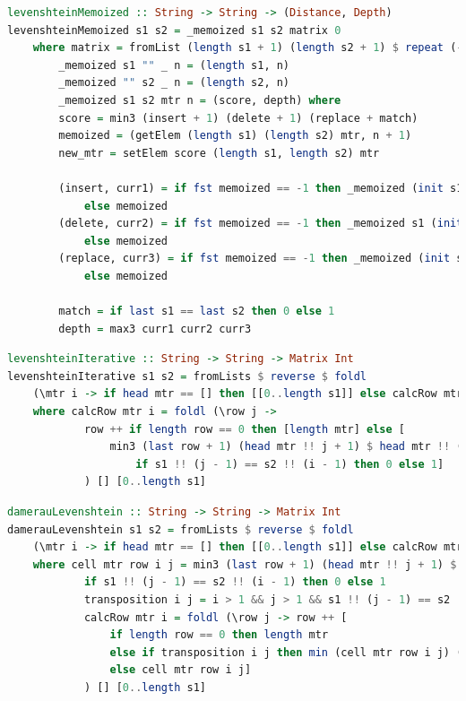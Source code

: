 \documentclass[12pt]{report}
\begin{document}
\begin{lstlisting}[label=some-code,caption=Функция нахождения расстояние Левенштейна рекурсивно с мемоизацией,language=Haskell]
levenshteinMemoized :: String -> String -> (Distance, Depth)
levenshteinMemoized s1 s2 = _memoized s1 s2 matrix 0
	where matrix = fromList (length s1 + 1) (length s2 + 1) $ repeat (-1) 
		_memoized s1 "" _ n = (length s1, n)
		_memoized "" s2 _ n = (length s2, n)
		_memoized s1 s2 mtr n = (score, depth) where
		score = min3 (insert + 1) (delete + 1) (replace + match)
		memoized = (getElem (length s1) (length s2) mtr, n + 1)
		new_mtr = setElem score (length s1, length s2) mtr 

		(insert, curr1) = if fst memoized == -1 then _memoized (init s1) s2 new_mtr (n + 1)
			else memoized
		(delete, curr2) = if fst memoized == -1 then _memoized s1 (init s2) new_mtr (n + 1)
			else memoized
		(replace, curr3) = if fst memoized == -1 then _memoized (init s1) (init s2) new_mtr (n + 1)
			else memoized

		match = if last s1 == last s2 then 0 else 1
		depth = max3 curr1 curr2 curr3
\end{lstlisting}

\begin{lstlisting}[label=some-code,caption=Функция нахождения расстояния Левенштейна итеративно,language=Haskell]
levenshteinIterative :: String -> String -> Matrix Int
levenshteinIterative s1 s2 = fromLists $ reverse $ foldl
	(\mtr i -> if head mtr == [] then [[0..length s1]] else calcRow mtr i : mtr) [[]] [0..length s2]
	where calcRow mtr i = foldl (\row j ->
			row ++ if length row == 0 then [length mtr] else [
				min3 (last row + 1) (head mtr !! j + 1) $ head mtr !! (j - 1) +
					if s1 !! (j - 1) == s2 !! (i - 1) then 0 else 1]
			) [] [0..length s1]
\end{lstlisting}


\begin{lstlisting}[label=some-code,caption=Функция нахождения расстояния Дамерау-Левенштейна матрично,language=Haskell]
damerauLevenshtein :: String -> String -> Matrix Int
damerauLevenshtein s1 s2 = fromLists $ reverse $ foldl
	(\mtr i -> if head mtr == [] then [[0..length s1]] else calcRow mtr i : mtr) [[]] [0..length s2]
	where cell mtr row i j = min3 (last row + 1) (head mtr !! j + 1) $ head mtr !! (j - 1) +
			if s1 !! (j - 1) == s2 !! (i - 1) then 0 else 1
			transposition i j = i > 1 && j > 1 && s1 !! (j - 1) == s2 !! (i - 2) && s1 !! (j - 2) == s2 !! (i - 1)
			calcRow mtr i = foldl (\row j -> row ++ [
				if length row == 0 then length mtr
				else if transposition i j then min (cell mtr row i j) (((head $ tail mtr) !! i - 2) + 1)
				else cell mtr row i j]
			) [] [0..length s1]
\end{lstlisting}
\end{document}
